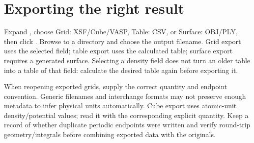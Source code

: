 
\section{Exporting the right result}
Expand , choose Grid: XSF/Cube/VASP, Table: CSV, or Surface: OBJ/PLY, then click . Browse to a directory and choose the output filename. Grid export uses the selected field; table export uses the calculated table; surface export requires a generated surface. Selecting a density field does not turn an older table into a table of that field: calculate the desired table again before exporting it.

When reopening exported grids, supply the correct quantity and endpoint convention. Generic filenames and interchange formats may not preserve enough metadata to infer physical units automatically. Cube export uses atomic-unit density/potential values; read it with the corresponding explicit quantity. Keep a record of whether duplicate periodic endpoints were written and verify round-trip geometry/integrals before combining exported data with the originals.
